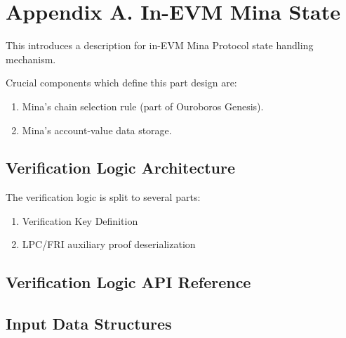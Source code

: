 \chapter{Appendix A. In-EVM Mina State}

This introduces a description for in-EVM Mina Protocol state handling mechanism.

Crucial components which define this part design are:
\begin{enumerate}
    \item Mina's chain selection rule (part of Ouroboros Genesis).
    \item Mina's account-value data storage.
\end{enumerate}

\section{Verification Logic Architecture}

The verification logic is split to several parts:
\begin{enumerate}
    \item Verification Key Definition
    \item LPC/FRI auxiliary proof deserialization
\end{enumerate}

\section{Verification Logic API Reference}

\section{Input Data Structures}
